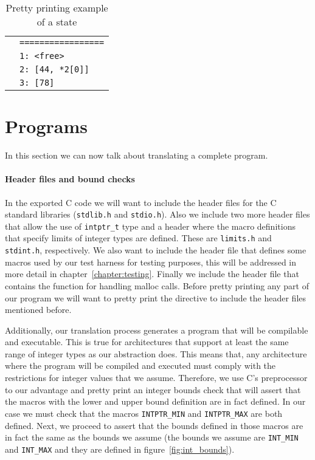 \begin{table}[h!]
\begin{tabular}{|l|l|}
                                                                                                               & \verb|=================| \\
                                                                                                               & \verb|1: <free>| \\
                                                                                                               & \verb|2: [44, *2[0]]| \\
                                                                                                               & \verb|3: [78]| \\
  \hline
\end{tabular}

\caption{Pretty printing example of a state}
\label{tab:pretty_simp_state}
\end{table}


\section{Programs}

In this section we can now talk about translating a complete program.

\paragraph{Header files and bound checks}
In the exported C code we will want to include the header files for the C standard libraries (\verb|stdlib.h| and \verb|stdio.h|).
Also we include two more header files that allow the use of \verb|intptr_t| type and a header where the macro definitions that specify limits of integer types are defined.
These are \verb|limits.h| and \verb|stdint.h|, respectively.
We also want to include the header file that defines some macros used by our test harness for testing purposes, this will be addressed in more detail in chapter~\ref{chapter:testing}.
Finally we include the header file that contains the function for handling malloc calls.
Before pretty printing any part of our program we will want to pretty print the directive to include the header files mentioned before.


Additionally, our translation process generates a program that will be compilable and executable.
This is true for architectures that support at least the same range of integer types as our abstraction does.
This means that, any architecture where the program will be compiled and executed must comply with the restrictions for integer values that we assume.
Therefore, we use C's preprocessor to our advantage and pretty print an integer bounds check that will assert that the macros with the lower and upper bound definition are in fact defined.
In our case we must check that the macros \verb|INTPTR_MIN| and \verb|INTPTR_MAX| are both defined.
Next, we proceed to assert that the bounds defined in those macros are in fact the same as the bounds we assume (the bounds we assume are \verb|INT_MIN| and \verb|INT_MAX| and they are defined in figure~\ref{fig:int_bounds}).



